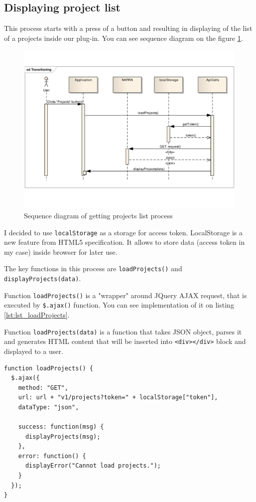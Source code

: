 \documentclass[thesis=B,english]{FITthesis}[2012/10/20]
\begin{document}
\subsection{Displaying project list}
This process starts with a press of a button and resulting in displaying of the list of a projects inside our plug-in. You can see sequence diagram on the figure \ref{fig:seq_project}.
	\begin{figure}
		\centering
		\includegraphics[width=1\textwidth]{ProjectsSeqDiag.pdf}
		\caption{Sequence diagram of getting projects list process}\label{fig:seq_project}
	\end{figure}

I decided to use \texttt{localStorage} as a storage for access token. LocalStorage is a new feature from HTML5 specification. It allows to store data (access token in my case) inside browser for later use.

The key functions in this process are \texttt{loadProjects()} and \texttt{displayProjects(data)}. 

Function \texttt{loadProjects()} is a "wrapper" around JQuery AJAX request, that is executed by \texttt{\$.ajax()} function. You can see implementation of it on listing \ref{lst:lst_loadProjects}.

Function \texttt{loadProjects(data)} is a function that takes JSON object, parses it and generates HTML content that will be inserted into \texttt{<div></div>} block and displayed to a user.
\begin{lstlisting}[caption=loadProjects() function, label=lst:lst_loadProjects]
function loadProjects() {
  $.ajax({
    method: "GET",
    url: url + "v1/projects?token=" + localStorage["token"],
    dataType: "json",

    success: function(msg) {
      displayProjects(msg);
    },
    error: function() {
      displayError("Cannot load projects.");
    }
  });
}
\end{lstlisting}
\end{document}
